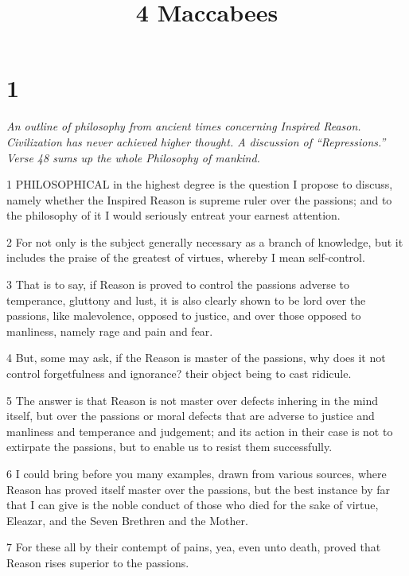 

\title{4 Maccabees}

\chapter{1}

\par \textit{An outline of philosophy from ancient times concerning Inspired Reason. Civilization has never achieved higher thought. A discussion of “Repressions.” Verse 48 sums up the whole Philosophy of mankind.}

\par 1 PHILOSOPHICAL in the highest degree is the question I propose to discuss, namely whether the Inspired Reason is supreme ruler over the passions; and to the philosophy of it I would seriously entreat your earnest attention.

\par 2 For not only is the subject generally necessary as a branch of knowledge, but it includes the praise of the greatest of virtues, whereby I mean self-control.

\par 3 That is to say, if Reason is proved to control the passions adverse to temperance, gluttony and lust, it is also clearly shown to be lord over the passions, like malevolence, opposed to justice, and over those opposed to manliness, namely rage and pain and fear.

\par 4 But, some may ask, if the Reason is master of the passions, why does it not control forgetfulness and ignorance? their object being to cast ridicule.

\par 5 The answer is that Reason is not master over defects inhering in the mind itself, but over the passions or moral defects that are adverse to justice and manliness and temperance and judgement; and its action in their case is not to extirpate the passions, but to enable us to resist them successfully.

\par 6 I could bring before you many examples, drawn from various sources, where Reason has proved itself master over the passions, but the best instance by far that I can give is the noble conduct of those who died for the sake of virtue, Eleazar, and the Seven Brethren and the Mother.

\par 7 For these all by their contempt of pains, yea, even unto death, proved that Reason rises superior to the passions.

